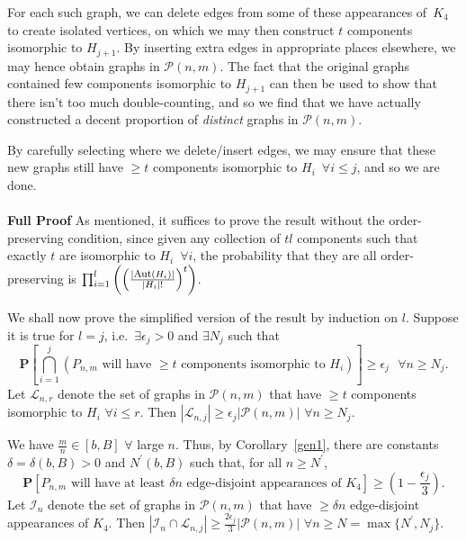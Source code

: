\documentclass{article}
\newtheorem{Proof of Theorem}{Proof of Theorem}
\begin{document}
For each such graph, 
we can delete edges from some of these appearances of~$K_{4}$ to create isolated vertices,
on which we may then construct $t$ components isomorphic to $H_{j+1}$.
By inserting extra edges in appropriate places elsewhere,
we may hence obtain graphs in $\mathcal{P}(n,m)$.
The fact that the original graphs contained 
few components isomorphic to $H_{j+1}$
can then be used to show that there isn't too much double-counting,
and so we find that we have actually constructed a decent proportion of \textit{distinct} graphs in $\mathcal{P}(n,m)$.

By carefully selecting where we delete/insert edges,
we may ensure that these new graphs still have $\geq t$ components 
isomorphic to $H_{i}$~$\forall i \leq j$,
and so we are done. \\
\\
\textbf{Full Proof} 
As mentioned, 
it suffices to prove the result without the order-preserving condition,
since given any collection of $tl$ components such that exactly $t$ are isomorphic to $H_{i}$~$\forall i$,
the probability that they are all order-preserving is
$\prod_{i=1}^{l} \left( \left( \frac{| \textrm{\footnotesize{Aut}}(H_{i}) |}{|H_{i}|!} \right)^{t} \right)$.

We shall now prove the simplified version of the result by induction on $l$.
Suppose it is true for $l=j$,
i.e.~$\exists \epsilon_{j} >0$ and $\exists N_{j}$ such that
\begin{displaymath}
\mathbf{P}
\left[ \bigcap_{i=1}^{j} 
\left(P_{n,m} \textrm{ will have $\geq t$ components isomorphic to } H_{i} \right) \right]
\geq \epsilon_{j} \textrm{ } \forall n \geq N_{j}.
\end{displaymath} 
Let $\mathcal{L}_{n,r}$ denote the set of graphs in $\mathcal{P}(n,m)$ that have $\geq t$ components
isomorphic to $H_{i}$ $\forall i \leq r$.
Then $|\mathcal{L}_{n,j}| \geq \epsilon_{j} |\mathcal{P}(n,m)|$ $\forall n \geq N_{j}$. 

We have $\frac{m}{n} \in [b,B]$ $\forall$ large $n$.
Thus, by Corollary~\ref{gen1}, 
there are constants $\delta = \delta(b,B) >0$ and $N^{\prime}(b,B)$ such that, for all $n \geq N^{\prime}$,
\begin{displaymath}
\mathbf{P}[P_{n,m} \textrm{ will have at least $\delta n$ edge-disjoint appearances of } K_{4}] 
\geq \left(1- \frac{\epsilon_{j}}{3} \right).
\end{displaymath}
Let $\mathcal{I}_{n}$ denote the set of graphs in $\mathcal{P}(n,m)$ 
that have $\geq \delta n$ edge-disjoint appearances of $K_{4}$.
Then $|\mathcal{I}_{n} \cap \mathcal{L}_{n,j}| \geq 
\frac{2 \epsilon_{j}}{3} |\mathcal{P}(n,m)|$ $\forall n \geq N = \max \{N^{\prime}, N_{j} \}$. 
\end{document}
